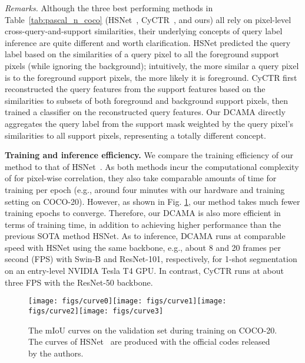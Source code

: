 \documentclass[runningheads,table,xcdraw]{llncs}
\begin{document}
\textit{Remarks.}
Although the three best performing methods in Table~\ref{tab:pascal_n_coco} (HSNet~\cite{min2021hypercorrelation}, CyCTR~\cite{zhang2021few}, and ours) all rely on pixel-level cross-query-and-support similarities, their underlying concepts of query label inference are quite different and worth clarification.
HSNet predicted the query label based on the similarities of a query pixel to all the foreground support pixels (while ignoring the background);
intuitively, the more similar a query pixel is to the foreground support pixels, the more likely it is foreground.
CyCTR first reconstructed the query features from the support features based on the similarities to subsets of both foreground and background support pixels, then trained a classifier on the reconstructed query features.
Our DCAMA directly aggregates the query label from the support mask weighted by the query pixel's similarities to all support pixels, representing a totally different concept.


\textbf{Training {\color{blue}and inference} efficiency.}
We compare the training efficiency of our method to that of HSNet~\cite{min2021hypercorrelation}.
As both methods incur the computational complexity of  for pixel-wise correlation,
they also take comparable amounts of time for training per epoch (e.g., around four minutes
with our hardware and training setting on COCO-20).
However, as shown in Fig. \ref{fig:traincurve}, our method takes much fewer training epochs to converge.
Therefore, our DCAMA is also more efficient in terms of training time, in addition to achieving higher performance than the previous SOTA method HSNet.
{\color{blue}As to inference, DCAMA runs at comparable speed with HSNet using the same backbone, e.g., about 8 and 20 frames per second (FPS) with Swin-B and ResNet-101, respectively, for 1-shot segmentation on an entry-level NVIDIA Tesla T4 GPU.
In contrast, CyCTR \cite{zhang2021few} runs at about three FPS with the ResNet-50 backbone.}



\begin{figure}[!t]
  \centering
   \texttt{[image: figs/curve0]}\hfill \texttt{[image: figs/curve1]}\hfill \texttt{[image: figs/curve2]}\hfill \texttt{[image: figs/curve3]}
   \caption{The mIoU curves on the validation set during training on COCO-20.
   The curves of HSNet~\cite{min2021hypercorrelation} are produced with the official codes released by the authors.}
   \label{fig:traincurve}
\end{figure}
\end{document}
